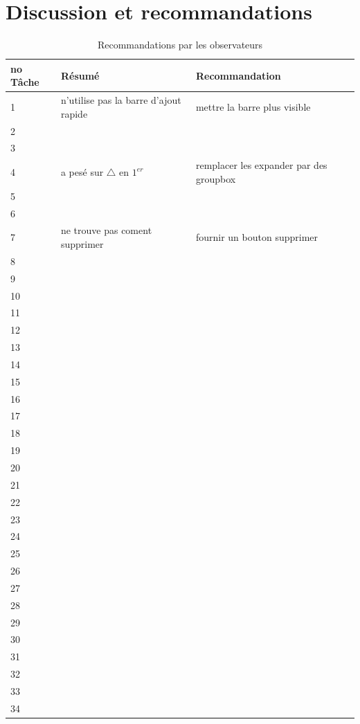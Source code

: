 \documentclass[letterpaper, oneside, 12pt, these, creativecommons]{thETS}
\begin{document}
\newpage

\section{Discussion et recommandations}

\begin{table}
	\centering
	\begin{tabular}{|l|l|l|}
	\hline
	no Tâche	& Résumé	& Recommandation 	\\ \hline
	1		&  n'utilise pas la barre d'ajout rapide		&  mettre la barre plus visible			\\ \hline
	2		& 							&  							\\ \hline
	3		& 							&  							\\ \hline
	4		&  a pesé sur	$\bigtriangleup$ en $1^{er}$	&  remplacer les expander par des groupbox	\\ \hline
	5		& 							&  							\\ \hline
	6		& 							&				  			\\ \hline
	7		& ne trouve pas coment supprimer		&  fournir un bouton supprimer			\\ \hline
	8		& 							&  							\\ \hline
	9		& 							&  							\\ \hline
	10		& 							&  							\\ \hline
	11		& 							&  							\\ \hline
	12		& 							&  							\\ \hline
	13		& 							&  							\\ \hline
	14		& 							&  							\\ \hline
	15		& 							&  							\\ \hline
	16		&							&  							\\ \hline
	17		& 							&  							\\ \hline
	18		& 							&  							\\ \hline
	19		& 							&  							\\ \hline
	20		& 							&  							\\ \hline
	21		& 							&  							\\ \hline
	22		& 							&  							\\ \hline
	23		& 							&  							\\ \hline
	24		& 							&  							\\ \hline
	25		& 							&  							\\ \hline
	26		& 							&  							\\ \hline
	27		& 							&  							\\ \hline
	28		& 							&  							\\ \hline
	29		& 							&  							\\ \hline
	30		& 							&  							\\ \hline
	31		& 							&  							\\ \hline
	32		& 							&  							\\ \hline
	33		& 							&  							\\ \hline
	34		& 							&  							\\ \hline
	\end{tabular}
	\caption{Recommandations par les observateurs}
\end{table}
\end{document}
